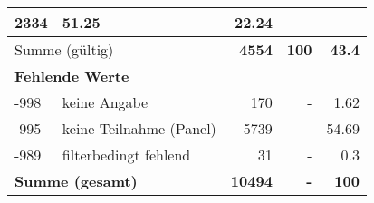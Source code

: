 \begin{longtable}{lXrrr}
       \num{2334} &
       \num[round-mode=places,round-precision=2]{51.25} &
         \num[round-mode=places,round-precision=2]{22.24} \\
     \midrule
     \multicolumn{2}{l}{Summe (gültig)} &
       \textbf{\num{4554}} &
     \textbf{\num{100}} &
       \textbf{\num[round-mode=places,round-precision=2]{43.4}} \\
     \multicolumn{5}{l}{\textbf{Fehlende Werte}}\\
       -998 &
       keine Angabe &
         \num{170} &
        - &
         \num[round-mode=places,round-precision=2]{1.62} \\
       -995 &
       keine Teilnahme (Panel) &
         \num{5739} &
        - &
         \num[round-mode=places,round-precision=2]{54.69} \\
       -989 &
       filterbedingt fehlend &
         \num{31} &
        - &
         \num[round-mode=places,round-precision=2]{0.3} \\
     \midrule
     \multicolumn{2}{l}{\textbf{Summe (gesamt)}} &
          \textbf{\num{10494}} &
        \textbf{-} &
        \textbf{\num{100}} \\
     \bottomrule
     \end{longtable}
     
